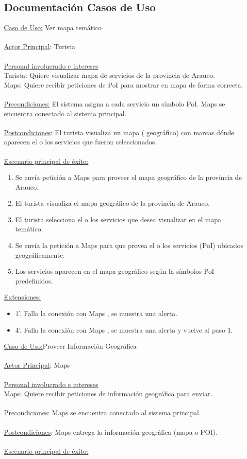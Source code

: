\documentclass[12pt]{article}
\begin{document}
\subsection{Documentación Casos de Uso}
\underline{Caso de Uso:} Ver mapa temático\\\\\underline{Actor Principal}: Turista\\\\\underline{Personal involucrado e intereses}\\Turista: Quiere visualizar mapa de servicios de la provincia de Arauco.\\
Maps: Quiere recibir peticiones de PoI para mostrar en mapa de forma correcta.\\\\\underline{Precondiciones:} El sistema asigna a cada servicio un símbolo PoI.
Maps se encuentra conectado al sistema principal.\\\\\underline{Postcondiciones}: El turista visualiza un mapa ( geográfico) con marcas dónde aparecen el o los servicios que fueron seleccionados.\\\\\underline{Escenario principal de éxito:}
\begin{enumerate}
\item Se envía petición a Maps para proveer el mapa geográfico de la provincia de Arauco.
\item El turista visualiza el mapa geográfico de la provincia de Arauco.
\item El turista selecciona el o los servicios que desea visualizar en el mapa temático.
\item Se envía la petición a Maps para que provea el o los servicios (PoI) ubicados geográficamente.
\item Los servicios aparecen en el mapa geográfico según la símbolos PoI predefinidos.
\end{enumerate}
\underline{Extensiones:}
\begin{itemize}
\item1’. Falla la conexión con Maps , se muestra una alerta.
\item4’.  Falla la conexión con Maps , se muestra una alerta  y vuelve al paso 1.
\end{itemize}
\underline{Caso de Uso:}Proveer Información Geográfica \\\\\underline{Actor Principal}: Maps\\\\\underline{Personal involucrado e intereses}\\Maps: Quiere recibir peticiones de información geográfica para enviar.\\\\\underline{Precondiciones:} Maps se encuentra conectado al sistema principal.\\\\\underline{Postcondiciones}: Maps entrega la información geográfica (mapa o POI).\\\\\underline{Escenario principal de éxito:}
\end{document}
